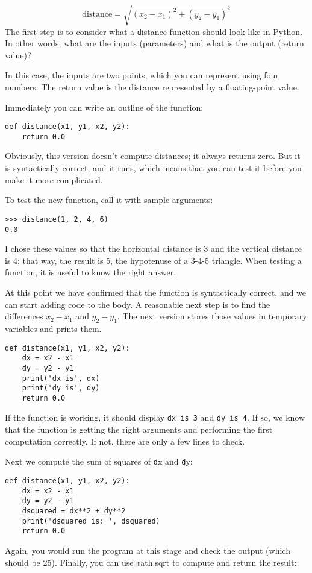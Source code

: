\documentclass[
DIV=11,
fontsize=13,
twoside,
headinclude=false,
titlepage=firstiscover,
abstract=true,
headsepline=true,
footsepline=true,
chapterprefix=true, %
headings=big,
bibliography=totoc,%
captions=tableheading
]{scrbook}
\theoremstyle{definition}
\begin{document}
\begin{displaymath}
\mathrm{distance} = \sqrt{(x_2 - x_1)^2 + (y_2 - y_1)^2}
\end{displaymath}
%
The first step is to consider what a {\texttt distance} function should
look like in Python.  In other words, what are the inputs (parameters)
and what is the output (return value)?

In this case, the inputs are two points, which you can represent
using four numbers.  The return value is the distance represented by
a floating-point value.

Immediately you can write an outline of the function:

\begin{lstlisting}
def distance(x1, y1, x2, y2):
    return 0.0
\end{lstlisting}
%
Obviously, this version doesn't compute distances; it always returns
zero.  But it is syntactically correct, and it runs, which means that
you can test it before you make it more complicated.

To test the new function, call it with sample arguments:

\begin{lstlisting}
>>> distance(1, 2, 4, 6)
0.0
\end{lstlisting}
%
I chose these values so that the horizontal distance is 3 and the
vertical distance is 4; that way, the result is 5, the hypotenuse 
of a 3-4-5 triangle. When testing a function, it is
useful to know the right answer.

At this point we have confirmed that the function is syntactically
correct, and we can start adding code to the body.
A reasonable next step is to find the differences
$x_2 - x_1$ and $y_2 - y_1$.  The next version stores those values in
temporary variables and prints them.

\begin{lstlisting}
def distance(x1, y1, x2, y2):
    dx = x2 - x1
    dy = y2 - y1
    print('dx is', dx)
    print('dy is', dy)
    return 0.0
\end{lstlisting}
%
If the function is working, it should display \verb"dx is 3" and 
\verb"dy is 4".  If so, we know that the function is getting the right
arguments and performing the first computation correctly.  If not,
there are only a few lines to check.

Next we compute the sum of squares of {\texttt dx} and {\texttt dy}:

\begin{lstlisting}
def distance(x1, y1, x2, y2):
    dx = x2 - x1
    dy = y2 - y1
    dsquared = dx**2 + dy**2
    print('dsquared is: ', dsquared)
    return 0.0
\end{lstlisting}
%
Again, you would run the program at this stage and check the output
(which should be 25).
Finally, you can use {\texttt math.sqrt} to compute and return the result:
\end{document}
